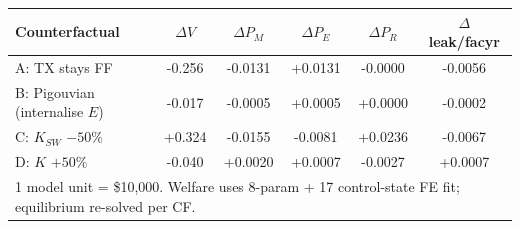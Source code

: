 \begin{tabular}{lccccc}
\hline
Counterfactual & $\Delta V$ & $\Delta P_M$ & $\Delta P_E$ & $\Delta P_R$ & $\Delta$ leak/facyr \\
\hline
A: TX stays FF & -0.256 & -0.0131 & +0.0131 & -0.0000 & -0.0056 \\
B: Pigouvian (internalise $E$) & -0.017 & -0.0005 & +0.0005 & +0.0000 & -0.0002 \\
C: $K_{SW}$ $-50\%$ & +0.324 & -0.0155 & -0.0081 & +0.0236 & -0.0067 \\
D: $K$ $+50\%$ & -0.040 & +0.0020 & +0.0007 & -0.0027 & +0.0007 \\
\hline
\multicolumn{6}{l}{\footnotesize 1 model unit = \$10,000.
  Welfare uses 8-param + 17 control-state FE fit; equilibrium re-solved per CF.}
\end{tabular}
